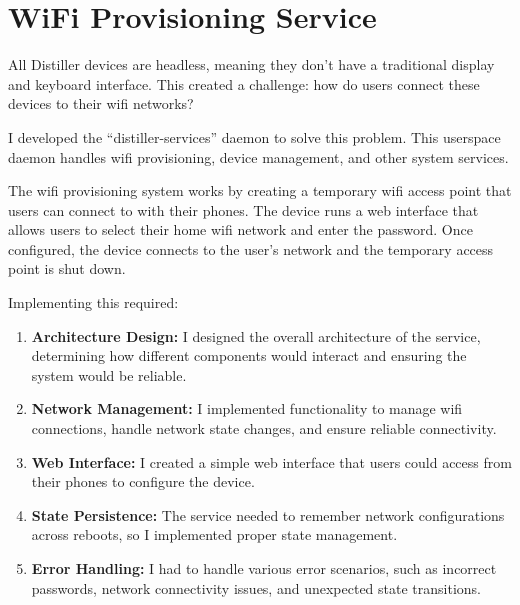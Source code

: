 \documentclass[12pt,a4paper]{report}
\begin{document}
\section{WiFi Provisioning Service}

All Distiller devices are headless, meaning they don't have a traditional display and keyboard interface. This created a challenge: how do users connect these devices to their wifi networks?

\vspace{0.3cm}

I developed the ``distiller-services'' daemon to solve this problem. This userspace daemon handles wifi provisioning, device management, and other system services.

\vspace{0.3cm}

The wifi provisioning system works by creating a temporary wifi access point that users can connect to with their phones. The device runs a web interface that allows users to select their home wifi network and enter the password. Once configured, the device connects to the user's network and the temporary access point is shut down.

\vspace{0.3cm}

Implementing this required:

\begin{enumerate}[itemsep=0.3cm]
    \item \textbf{Architecture Design:} I designed the overall architecture of the service, determining how different components would interact and ensuring the system would be reliable.

    \item \textbf{Network Management:} I implemented functionality to manage wifi connections, handle network state changes, and ensure reliable connectivity.

    \item \textbf{Web Interface:} I created a simple web interface that users could access from their phones to configure the device.

    \item \textbf{State Persistence:} The service needed to remember network configurations across reboots, so I implemented proper state management.

    \item \textbf{Error Handling:} I had to handle various error scenarios, such as incorrect passwords, network connectivity issues, and unexpected state transitions.
\end{enumerate}
\end{document}
